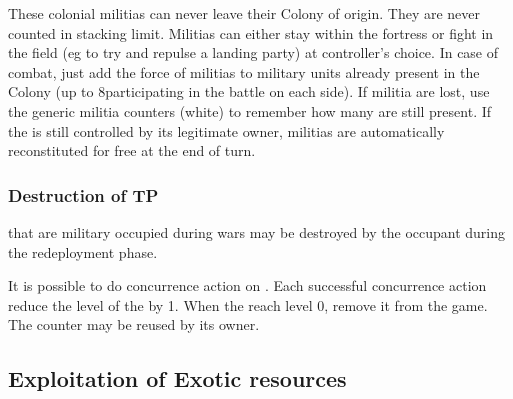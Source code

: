  These colonial militias can never leave their
Colony of origin. They are never counted in stacking limit.
\bparag Militias can either stay within the fortress or fight in the field (eg
to try and repulse a landing party) at controller's choice.
\bparag In case of combat, just add the force of militias to military units
already present in the Colony (up to 8\LD participating in the battle on each
side).
\bparag If militia are lost, use the generic militia counters (white) to
remember how many \LDE are still present.
\bparag If the \COL is still controlled by its legitimate owner, militias are
automatically reconstituted for free at the end of turn.


\subsubsection{Destruction of TP}
\aparag \TP that are military occupied during wars may be destroyed by the
occupant during the redeployment phase.

\aparag It is possible to do concurrence action on \TP. Each successful
concurrence action reduce the level of the \TP by 1.
\bparag When the \TP reach level 0, remove it from the game. The counter may
be reused by its owner.






\subsection{Exploitation of Exotic resources}

